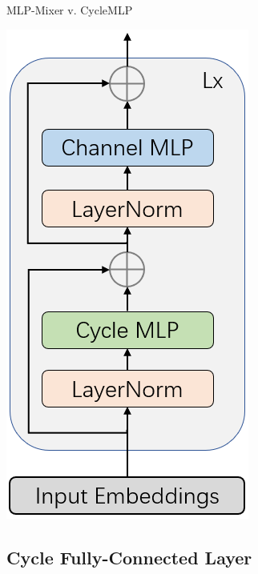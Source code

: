 \documentclass{beamer}
\begin{document}
\begin{frame}{MLP-Mixer v. CycleMLP}
    \parbox{.4\textwidth}{\centering \includegraphics[height=.8\textheight]{figures/cycle_mlp.png}}
\end{frame}

\subsection{Cycle Fully-Connected Layer}
\end{document}
